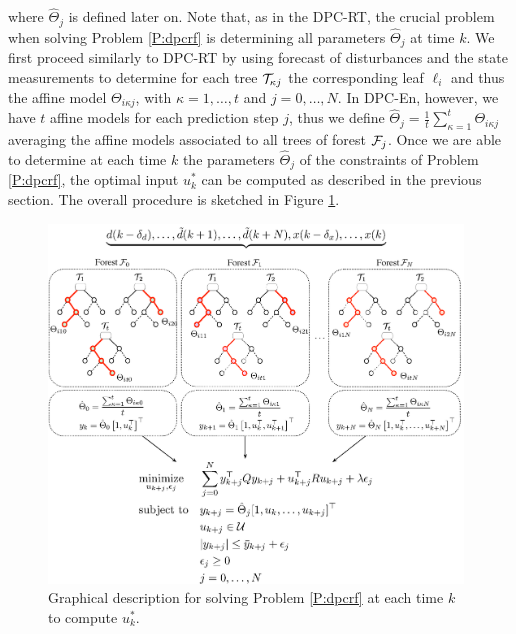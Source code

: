 \noindent \textcolor[rgb]{0,0,1}{where $\hat{\Theta}_{j}$ is defined later on. Note that, as in the DPC-RT, the crucial problem when solving Problem \ref{P:dpcrf} is determining all parameters $\hat{\Theta}_{j}$ at time $k$. We first proceed similarly to DPC-RT by using forecast of disturbances and the state measurements to determine for each tree $\mathcal{T}_{\kappa j}$ the corresponding leaf $\ell_i$ and thus the affine model $\Theta_{i \kappa j}$, with $\kappa = 1,\ldots,t$ and $j = 0,\ldots,N$. In DPC-En, however, we have $t$ affine models for each prediction step $j$, thus we define $\hat{\Theta}_{j} = \frac{1}{t}\sum\limits_{\kappa = 1}^{t} \Theta_{i \kappa j}$ averaging the affine models associated to all trees of forest $\mathcal{F}_j$. Once we are able to determine at each time $k$ the parameters $\hat{\Theta}_{j}$ of the constraints of Problem \ref{P:dpcrf}, the optimal input $u^*_k$ can be computed as described in the previous section. The overall procedure is sketched in Figure \ref{F:dpc-algo-rf}.}
\begin{figure}[t!]
	\centering
	\includegraphics[width=26pc]{figures/dpc-algo-rf.eps}
	\caption{\textcolor[rgb]{0,0,1}{Graphical description for solving Problem \ref{P:dpcrf} at each time $k$ to compute \(u_k^*\).}}
	\label{F:dpc-algo-rf}
\end{figure}

